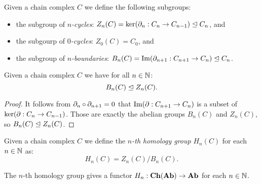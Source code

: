\begin{definition}
	Given a chain complex $C$ we define the following subgroups:
	\begin{itemize}
		\item the subgroup of \emph{$n$-cycles}: $Z_n(C) = \ker(\partial_n: C_n \to C_{n-1}) \trianglelefteq C_n$, and
		\item the subgourp of \emph{$0$-cycles}: $Z_0(C) = C_0$, and
		\item the subgroup of \emph{$n$-boundaries}: $B_n(C) = \operatorname{Im}(\partial_{n+1}: C_{n+1} \to C_n) \trianglelefteq C_n$.
	\end{itemize}
\end{definition}
\begin{lemma}
	Given a chain complex $C$ we have for all $n \in \mathbb{N}$:
	$$ B_n(C) \trianglelefteq Z_n(C).$$
\end{lemma}
\begin{proof}
	It follows from $\partial_n \circ \partial_{n+1} = 0$ that $\operatorname{Im}(\partial: C_{n+1} \to C_n)$ is a subset of $\ker(\partial: C_n \to C_{n-1})$. Those are exactly the abelian groups $B_n(C)$ and $Z_n(C)$, so $ B_n(C) \trianglelefteq Z_n(C) $.
\end{proof}
\begin{definition}
	Given a chain complex $C$ we define the \emph{$n$-th homology group} $H_n(C)$ for each $n \in \mathbb{N}$ as:
	$$ H_n(C) = Z_n(C) / B_n(C).$$
\end{definition}
\begin{lemma}
	The $n$-th homology group gives a functor $H_n : \mathbf{Ch}(\mathbf{Ab}) \to \mathbf{Ab}$ for each $n \in \mathbb{N}$.
\end{lemma}
